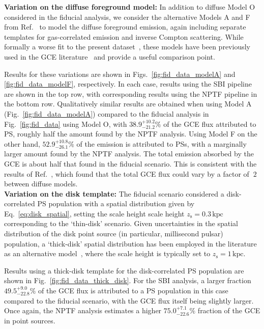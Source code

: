 \documentclass[prd,aps,10pt,nofootinbib,twocolumn,superscriptaddress,preprintnumbers,balancelastpage,longbibliography]{revtex4-1}
\begin{document}
\noindent
\textbf{Variation on the diffuse foreground model:}
In addition to diffuse Model O considered in the fiducial analysis, we consider the alternative Models A and F from Ref.~\cite{Calore:2014xka} to model the diffuse foreground emission, again including separate templates for gas-correlated emission and inverse Compton scattering. While formally a worse fit to the present dataset~\cite{Buschmann:2020adf}, these models have been previously used in the GCE literature~\cite{Buschmann:2020adf,Leane:2020pfc,Leane:2020nmi} and provide a useful comparison point.

Results for these variations are shown in Figs.~\ref{fig:fid_data_modelA} and \ref{fig:fid_data_modelF}, respectively. In each case, results using the SBI pipeline are shown in the top row, with corresponding results using the NPTF pipeline in the bottom row. 
Qualitatively similar results are obtained when using Model A (Fig.~\ref{fig:fid_data_modelA}) compared to the fiducial analysis in Fig.~\ref{fig:fid_data} using Model O, with $38.9^{+10.2}_{-21.2}\%$ of the GCE flux attributed to PS, roughly half the amount found by the NPTF analysis. Using Model F on the other hand, $52.9^{+10.8}_{-26.1}\%$ of the emission is attributed to PSs, with a marginally larger amount found by the NPTF analysis. The total emission absorbed by the GCE is about half that found in the fiducial scenario. This is consistent with the results of Ref.~\cite{Buschmann:2020adf}, which found that the total GCE flux could vary by a factor of $~2$ between diffuse models. \\

\noindent
\textbf{Variation on the disk template:}
The fiducial scenario considered a disk-correlated PS population with a spatial distribution given by Eq.~\eqref{eq:disk_spatial}, setting the scale height scale height $z_\mathrm{s} = 0.3\,\mathrm{kpc}$ corresponding to the `thin-disk' scenario. Given uncertainties in the spatial distribution of the disk point source (in particular, millisecond pulsar) population, a `thick-disk' spatial distribution has been employed in the literature as an alternative model~\cite{Lee:2015fea,Leane:2019xiy,Buschmann:2020adf}, where the scale height is typically set to $z_\mathrm{s} = 1\,\mathrm{kpc}$. 

Results using a thick-disk template for the disk-correlated PS population are shown in Fig.~\ref{fig:fid_data_thick_disk}. For the SBI analysis, a larger fraction $49.5^{+9.0}_{-22.8}\%$ of the GCE flux is attributed to a PS population in this case compared to the fiducial scenario, with the GCE flux itself being slightly larger. Once again, the NPTF analysis estimates a higher $75.0^{+7.1}_{-22.6}\%$ fraction of the GCE in point sources.\\
\end{document}
